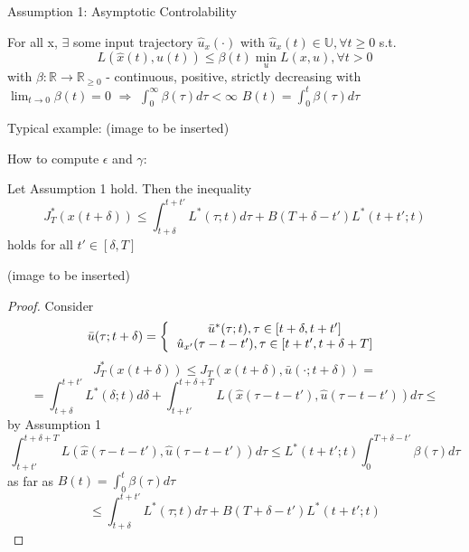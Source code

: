Assumption 1: Asymptotic Controlability

For all x, $\exists$ some input trajectory $\hat u_x(\cdot)$
with $\hat u_x(t) \in \mathbb{U}, \forall t \geq 0$ s.t.
\begin{equation*}
L(\hat x(t),\hat u(t)) \leq \beta(t) \min_u L(x,u), \forall t > 0
\end{equation*}
with $\beta: \mathbb{R} \to \mathbb{R}_{\geq 0}$
 - continuous, positive, strictly decreasing with $\lim_{t \to 0} \beta(t) = 0$ $\Rightarrow$
$\int_0^{\infty}\beta(\tau)d\tau < \infty$
$B(t) = \int_0^t\beta(\tau)d\tau$

Typical example: (image to be inserted)

How to compute $\epsilon$ and $\gamma$:
\begin{Lemma} 
Let Assumption 1 hold. Then the inequality 
\begin{equation}\label{lemma_1_inequality}
J_T^*(x(t+\delta)) \leq \int_{t+\delta}^{t+t'}L^*(\tau;t)d\tau + B(T+\delta - t')L^*(t+t';t)
\end{equation}
holds for all $t' \in [\delta,T]$

(image to be inserted)


\begin{proof}

Consider 
\begin{equation*}
\bar u(\tau;t+\delta) = \left \{
  \begin{tabular}{c}
  $\bar u^*(\tau;t), \tau \in [t+\delta, t+t']$ \\
  $\hat u_{x'}(\tau - t - t'), \tau \in [t+t', t+\delta + T]$
  \end{tabular}
\right.
\end{equation*}
\begin{equation*}
J^*_T(x(t+\delta)) \leq J_T(x(t+\delta), \bar u(\cdot;t+\delta)) =
\end{equation*}
\begin{equation*}
=\int^{t+t'}_{t+\delta}L^*(\delta;t)d\delta + \int_{t+t'}^{t+\delta+T}L(\hat x(\tau - t - t'), \hat u (\tau - t - t'))d\tau \leq
\end{equation*} 
by Assumption 1
\begin{equation*}
\int_{t+t'}^{t+\delta+T}L(\hat x(\tau - t - t'), \hat u (\tau - t - t'))d\tau \leq L^*(t+t';t) \int_0^{T+\delta-t'}\beta(\tau)d\tau
\end{equation*}
as far as $B(t) = \int_0^t\beta(\tau)d\tau$
\begin{equation*}
\leq \int_{t+\delta}^{t+t'}L^*(\tau;t)d\tau + B(T+\delta-t')L^*(t+t';t)
\end{equation*}
\end{proof}
\end{Lemma}

